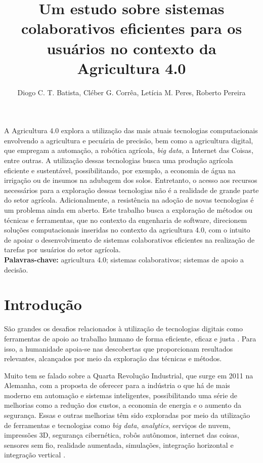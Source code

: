 \documentclass[12pt]{article}
\title{Um estudo sobre sistemas colaborativos eficientes para os usuários no contexto da Agricultura 4.0}
\author{Diogo C. T. Batista\inst{1}, Cléber G. Corrêa\inst{1}, Letícia M. Peres\inst{2}, Roberto Pereira\inst{2}}
\begin{document}
 

\maketitle
     
\begin{resumo} 
A Agricultura 4.0 explora a utilização das mais atuais tecnologias computacionais envolvendo a agricultura e pecuária de precisão, bem como a agricultura digital, que empregam a automação, a robótica agrícola, \textit{big data}, a Internet das Coisas, entre outras. A utilização dessas tecnologias busca uma produção agrícola eficiente e sustentável, possibilitando, por exemplo, a economia de água na irrigação ou de insumos na adubagem dos solos. Entretanto, o acesso aos recursos necessários para a exploração dessas tecnologias não é a realidade de grande parte do setor agrícola. Adicionalmente, a resistência na adoção de novas tecnologias é um problema ainda em aberto. Este trabalho busca a exploração de métodos ou técnicas e ferramentas, que no contexto da engenharia de software, direcionem soluções computacionais inseridas no contexto da agricultura 4.0, com o intuito de apoiar o desenvolvimento de sistemas colaborativos eficientes na realização de tarefas por usuários do setor agrícola.\\

\textbf{Palavras-chave:} agricultura 4.0; sistemas colaborativos; sistemas de apoio a decisão.
\end{resumo}

\section{Introdução}
\label{sec:introducao}

São grandes os desafios relacionados à utilização de tecnologias digitais como ferramentas de apoio ao trabalho humano de forma eficiente, eficaz e justa \cite{Rose:2019}. Para isso, a humanidade apoia-se nas descobertas que proporcionam resultados relevantes, alcançados por meio da exploração das técnicas e métodos.

Muito tem se falado sobre a Quarta Revolução Industrial, que surge em 2011 na Alemanha, com a proposta de oferecer para a indústria o que há de mais moderno em automação e sistemas inteligentes, possibilitando uma série de melhorias como a redução dos custos, a economia de energia e o aumento da segurança. Essas e outras melhorias têm sido exploradas por meio da utilização de ferramentas e tecnologias como \textit{big data}, \textit{analytics}, serviços de nuvem, impressões 3D, segurança cibernética, robôs autônomos, internet das coisas, sensores sem fio, realidade aumentada, simulações, integração horizontal e integração vertical \cite{Souza:2017}.
\end{document}
